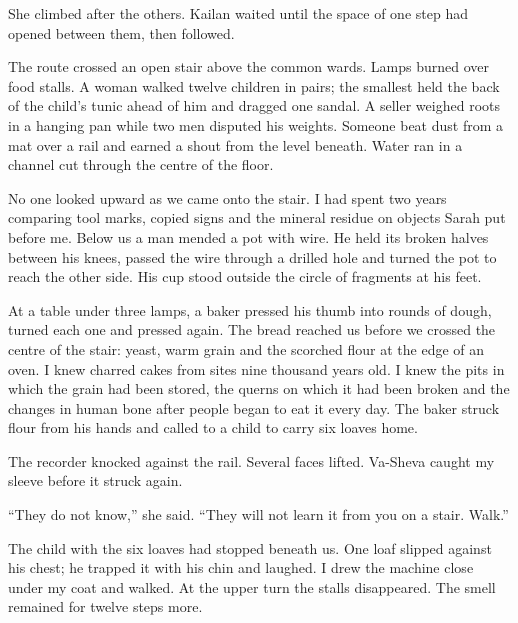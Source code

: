 She climbed after the others. Kailan waited until the space of one step had opened between them, then followed.\par

\ornament

The route crossed an open stair above the common wards. Lamps burned over food stalls. A woman walked twelve children in pairs; the smallest held the back of the child's tunic ahead of him and dragged one sandal. A seller weighed roots in a hanging pan while two men disputed his weights. Someone beat dust from a mat over a rail and earned a shout from the level beneath. Water ran in a channel cut through the centre of the floor.\par

No one looked upward as we came onto the stair. I had spent two years comparing tool marks, copied signs and the mineral residue on objects Sarah put before me. Below us a man mended a pot with wire. He held its broken halves between his knees, passed the wire through a drilled hole and turned the pot to reach the other side. His cup stood outside the circle of fragments at his feet.\par

At a table under three lamps, a baker pressed his thumb into rounds of dough, turned each one and pressed again. The bread reached us before we crossed the centre of the stair: yeast, warm grain and the scorched flour at the edge of an oven. I knew charred cakes from sites nine thousand years old. I knew the pits in which the grain had been stored, the querns on which it had been broken and the changes in human bone after people began to eat it every day. The baker struck flour from his hands and called to a child to carry six loaves home.\par

The recorder knocked against the rail. Several faces lifted. Va-Sheva caught my sleeve before it struck again.\par

``They do not know,'' she said. ``They will not learn it from you on a stair. Walk.''\par

The child with the six loaves had stopped beneath us. One loaf slipped against his chest; he trapped it with his chin and laughed. I drew the machine close under my coat and walked. At the upper turn the stalls disappeared. The smell remained for twelve steps more.\par

\ornament

